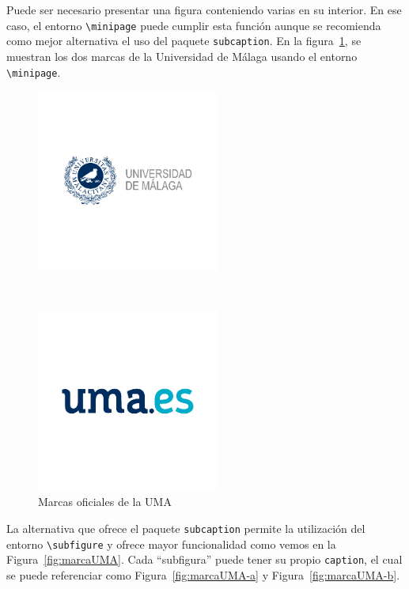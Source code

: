Puede ser necesario presentar una figura conteniendo varias en su interior. En ese caso, el entorno \verb|\minipage| puede cumplir esta función aunque se recomienda como mejor alternativa el uso del paquete \texttt{subcaption}. En la figura~\ref{fig:marca:UMA}, se muestran los dos marcas de la Universidad de Málaga usando el entorno \verb|\minipage|.

	\begin{figure}[ht]
		\centering
			\begin{minipage}[l]{6cm}
			\includegraphics[width=6cm]{figuras/MarcaUMA.pdf}
			\end{minipage}
			\ \
			\begin{minipage}[r]{6cm}
			\includegraphics[width=6cm]{figuras/marcaumaes.pdf}
			\end{minipage}
		\caption{Marcas oficiales de la UMA}
		\label{fig:marca:UMA}
	\end{figure}

La alternativa que ofrece el paquete \texttt{subcaption} permite la utilización del entorno \verb|\subfigure| y ofrece mayor funcionalidad como vemos en la Figura~\ref{fig:marcaUMA}. Cada ``subfigura'' puede tener su propio \texttt{caption}, el cual se puede referenciar como Figura~\ref{fig:marcaUMA-a} y Figura~\ref{fig:marcaUMA-b}.

